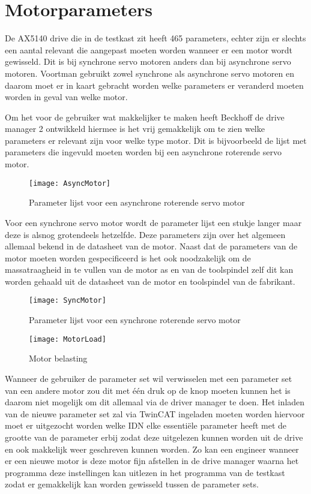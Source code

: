 \section{Motorparameters}

De \gls{AX5140} drive die in de testkast zit heeft 465 parameters, echter zijn er slechts een aantal relevant die aangepast moeten worden wanneer er een motor wordt gewisseld. Dit is bij synchrone servo motoren anders dan bij asynchrone servo motoren. Voortman gebruikt zowel synchrone als asynchrone servo motoren en daarom moet er in kaart gebracht worden welke parameters er veranderd moeten worden in geval van welke motor.

\vspace{0.5cm}

Om het voor de gebruiker wat makkelijker te maken heeft Beckhoff de drive manager 2 ontwikkeld hiermee is het vrij gemakkelijk om te zien welke parameters er relevant zijn voor welke type motor. Dit is bijvoorbeeld de lijst met parameters die ingevuld moeten worden bij een asynchrone roterende servo motor.

\begin{figure}[H]
	\centering
	\texttt{[image: AsyncMotor]}
	\label{fig:AsyncMotor}
	\caption{Parameter lijst voor een asynchrone roterende servo motor}
\end{figure}

Voor een synchrone servo motor wordt de parameter lijst een stukje langer maar deze is alsnog grotendeels hetzelfde. Deze parameters zijn over het algemeen allemaal bekend in de datasheet van de motor. Naast dat de parameters van de motor moeten worden gespecificeerd is het ook noodzakelijk om de massatraagheid in te vullen van de motor as en van de toolspindel zelf dit kan worden gehaald uit de datasheet van de motor en toolspindel van de fabrikant.

\begin{figure}[H]
	\centering
	\texttt{[image: SyncMotor]}
	\label{fig:SyncMotor}
	\caption{Parameter lijst voor een synchrone roterende servo motor}
\end{figure}

\begin{figure}[H]
	\centering
	\texttt{[image: MotorLoad]}
	\label{fig:MotorLoad}
	\caption{Motor belasting}
\end{figure}

Wanneer de gebruiker de parameter set wil verwisselen met een parameter set van een andere motor zou dit met één druk op de knop moeten kunnen het is daarom niet mogelijk om dit allemaal via de driver manager te doen. Het inladen van de nieuwe parameter set zal via \gls{TwinCAT} ingeladen moeten worden hiervoor moet er uitgezocht worden welke \gls{IDN} elke essentiële parameter heeft met de grootte van de parameter erbij zodat deze uitgelezen kunnen worden uit de drive en ook makkelijk weer geschreven kunnen worden. Zo kan een engineer wanneer er een nieuwe motor is deze motor fijn afstellen in de drive manager waarna het programma deze instellingen kan uitlezen in het programma van de testkast zodat er gemakkelijk kan worden gewisseld tussen de parameter sets.

